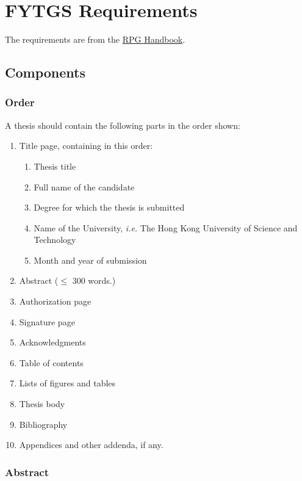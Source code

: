 \chapter{FYTGS Requirements}
\label{chap:thesis-preparation}

The requirements are from the \href{https://fytgs.hkust.edu.hk/academics/Academic-Regulations-and-Requirements/Handbook-for-Research-Postgraduate-Studies/guidelines-thesis-preparation}{RPG Handbook}.

\section{Components}

\subsection{Order}

A thesis should contain the following parts in the order shown:

\begin{enumerate}
  \item Title page, containing in this order:
        \begin{enumerate}
          \item Thesis title
          \item Full name of the candidate
          \item Degree for which the thesis is submitted
          \item Name of the University, \emph{i.e.} The Hong Kong University of Science and Technology
          \item Month and year of submission
        \end{enumerate}
  \item Abstract ($\leq$ 300 words.)
  \item Authorization page
  \item Signature page
  \item Acknowledgments
  \item Table of contents
  \item Lists of figures and tables
  \item Thesis body
  \item Bibliography
  \item Appendices and other addenda, if any.
\end{enumerate}

\subsection{Abstract}

